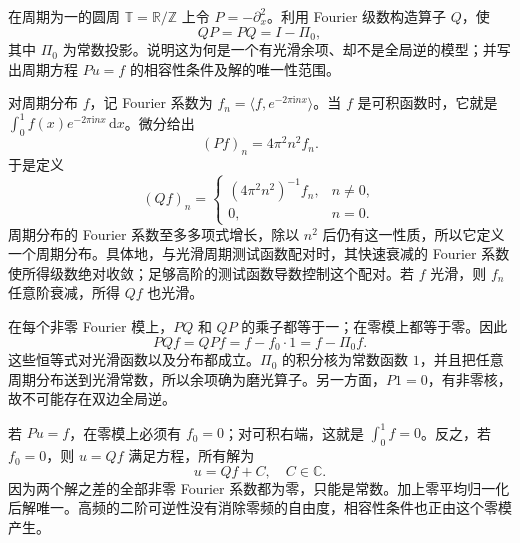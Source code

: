 \begin{exercise}\label{b2:ex:app-G-7}
在周期为一的圆周 \(\mathbb T=\mathbb R/\mathbb Z\) 上令 \(P=-\partial_x^2\)。利用 Fourier 级数构造算子 \(Q\)，使
\[
 QP=PQ=I-\Pi_0,
\]
其中 \(\Pi_0\) 为常数投影。说明这为何是一个有光滑余项、却不是全局逆的模型；并写出周期方程 \(Pu=f\) 的相容性条件及解的唯一性范围。
\end{exercise}
\begin{solution}
对周期分布 \(f\)，记 Fourier 系数为
\(f_n=\langle f,e^{-2\pi\mathrm inx}\rangle\)。当 \(f\) 是可积函数时，它就是 \(\int_0^1f(x)e^{-2\pi\mathrm inx}\,\mathrm dx\)。微分给出
\[
 (Pf)_n=4\pi^2n^2f_n.
\]
于是定义
\[
 (Qf)_n=
 \begin{cases}
  (4\pi^2n^2)^{-1}f_n,&n\ne0,\\
  0,&n=0.
 \end{cases}
\]
周期分布的 Fourier 系数至多多项式增长，除以 \(n^2\) 后仍有这一性质，所以它定义一个周期分布。具体地，与光滑周期测试函数配对时，其快速衰减的 Fourier 系数使所得级数绝对收敛；足够高阶的测试函数导数控制这个配对。若 \(f\) 光滑，则 \(f_n\) 任意阶衰减，所得 \(Qf\) 也光滑。

在每个非零 Fourier 模上，\(PQ\) 和 \(QP\) 的乘子都等于一；在零模上都等于零。因此
\[
 PQf=QPf=f-f_0\cdot1=f-\Pi_0f.
\]
这些恒等式对光滑函数以及分布都成立。\(\Pi_0\) 的积分核为常数函数 \(1\)，并且把任意周期分布送到光滑常数，所以余项确为磨光算子。另一方面，\(P1=0\)，有非零核，故不可能存在双边全局逆。

若 \(Pu=f\)，在零模上必须有 \(f_0=0\)；对可积右端，这就是
\(\int_0^1f=0\)。反之，若 \(f_0=0\)，则 \(u=Qf\) 满足方程，所有解为
\[
 u=Qf+C,\quad C\in\mathbb C.
\]
因为两个解之差的全部非零 Fourier 系数都为零，只能是常数。加上零平均归一化后解唯一。高频的二阶可逆性没有消除零频的自由度，相容性条件也正由这个零模产生。
\end{solution}

